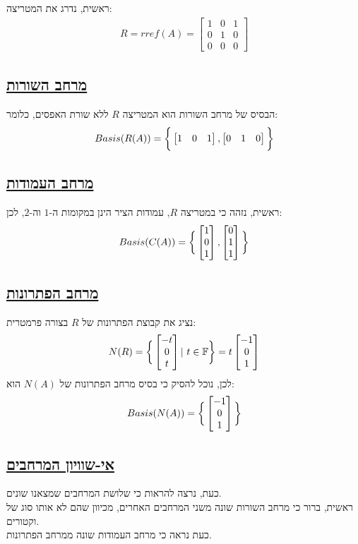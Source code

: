 \documentclass[a4paper, 12pt, leqno]{article}
\newcommand{\sub}[1]{\subsection{\underline{#1}}}
\newcommand{\F}{\ensuremath{\mathbb{F}}}
\newcommand{\eq}[1]{\begin{align*}#1\end{align*}}
\newcommand{\bigset}[1]{\bigg{\{} #1 \bigg{\}}}
\begin{document}
\section{}
ראשית, נדרג את המטריצה:
\eq{
    R=rref(A)=
    \begin{bmatrix}
        1&0&1\\0&1&0\\0&0&0
    \end{bmatrix}
}
\sub{מרחב השורות}
הבסיס של מרחב השורות הוא המטריצה $R$ ללא שורת האפסים, כלומר:
\eq{
    Basis(R(A))=
    \bigset{
        \begin{bmatrix}
            1&0&1
        \end{bmatrix}
        ,
        \begin{bmatrix}
            0&1&0
        \end{bmatrix}
    }
}
\sub{מרחב העמודות}
ראשית, נזהה כי במטריצה $R$, עמודות הציר הינן במקומות ה-$1$ וה-$2$, לכן:
\eq{
    Basis(C(A))=
    \bigset{
        \begin{bmatrix}
            1\\0\\1
        \end{bmatrix}
        ,
        \begin{bmatrix}
            0\\1\\1
        \end{bmatrix}
    }
}
\sub{מרחב הפתרונות}
נציג את קבוצת הפתרונות של $R$ בצורה פרמטרית:
\eq{
    N(R)=\bigset{
        \begin{bmatrix}
            -t\\0\\t
        \end{bmatrix}
        |~t\in\F
    }
    =t\begin{bmatrix}
        -1\\0\\1
    \end{bmatrix}
}
לכן, נוכל להסיק כי בסיס מרחב הפתרונות של $N(A)$ הוא:
\eq{
    Basis(N(A))=\bigset{\begin{bmatrix}
        -1\\0\\1
    \end{bmatrix}}
}
\pagebreak
\sub{אי-שוויון המרחבים}
כעת, נרצה להראות כי שלושת המרחבים שמצאנו שונים.\\
ראשית, ברור כי מרחב השורות שונה משני המרחבים האחרים, מכיוון שהם לא אותו סוג של וקטורים.\\
כעת נראה כי מרחב העמודות שונה ממרחב הפתרונות.\\
\end{document}
